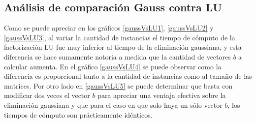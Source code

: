 \subsection{Análisis de comparación Gauss contra LU}
Como se puede apreciar en los gráficos \ref{gaussVsLU1}, \ref{gaussVsLU2} y \ref{gaussVsLU3}, al variar la cantidad de instancias el tiempo de cómputo de la factorización LU fue muy inferior al tiempo de la eliminación gaussiana, y esta diferencia se hace sumamente notoria a medida que la cantidad de vectores $b$ a calcular aumenta. En el gráfico \ref{gaussVsLU4} se puede observar como la diferencia es proporcional tanto a la cantidad de instancias como al tamaño de las matrices. Por otro lado en \ref{gaussVsLU5} se puede determinar que basta con modificar dos veces el vector $b$ para apreciar una ventaja efectiva sobre la eliminación gaussiana y que para el caso en que solo haya un sólo vector $b$, los tiempos de cómputo son prácticamente idénticos.
